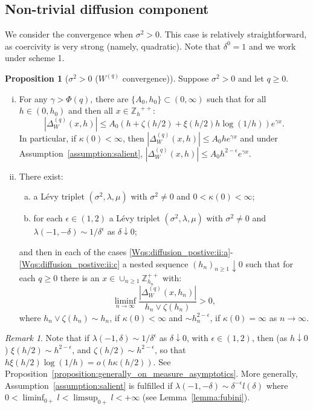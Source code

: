 \documentclass[pdftex,oneside,11pt,reqno]{amsart}
\theoremstyle{definition}
\theoremstyle{theorem}
\newtheorem{proposition}{Proposition}[section]
\theoremstyle{remark}
\newtheorem{remark}{Remark}[section]
\numberwithin{equation}{section}
\numberwithin{definition}{section}
\begin{document}
\subsection{Non-trivial diffusion component}
We consider the convergence when ${\sigma^2}>0$. This case is relatively straightforward, as coercivity is very strong (namely, quadratic). Note that $\delta^0=1$ and we work under scheme 1.

\begin{proposition}[${\sigma^2}>0$ (${W^{(q)}}$ convergence)] \label{proposition:Wqconvergence:non-trivial_diffusion}
Suppose ${\sigma^2}>0$ and let $q\geq 0$. 

\begin{enumerate}[(i)]
\item\label{Wqs:diffusion_positibe:i} For any $\gamma>\Phi(q)$, there are $\{A_0,h_0\}\subset (0,\infty)$ such that for all $h\in (0,h_0)$ and then all $x\in {\mathbb{Z}_h}^{++}$: $$\left\vert{\Delta_{W}^{(q)}(x,h)}\right\vert\leq A_0 \left(h+\zeta(h/2)+\xi(h/2)h\log(1/h)\right) e^{\gamma x}.$$ In particular, if $\kappa(0)<\infty$, then $\left\vert{\Delta_{W}^{(q)}(x,h)}\right\vert\leq A_0 he^{\gamma x}$ and under Assumption~\ref{assumption:salient}, $\left\vert{\Delta_{W}^{(q)}(x,h)}\right\vert\leq A_0 h^{2-\epsilon}e^{\gamma x}$. 
\item \label{Wqs:diffusion_positibe:ii} There exist:
\begin{enumerate}[(a)]
\item\label{Wqs:diffusion_postive:ii:a} a L\'evy triplet $({\sigma^2},{\lambda},{\mu})$ with ${\sigma^2}\ne 0$ and $0<\kappa(0)<\infty$;
\item\label{Wqs:diffusion_postive:ii:c}  for each $\epsilon\in (1,2)$ a L\'evy triplet $({\sigma^2},{\lambda},{\mu})$ with ${\sigma^2}\ne 0$ and $\lambda(-1,-\delta)\sim 1/\delta^\epsilon$ as $\delta\downarrow 0$;
\end{enumerate}
and then in each of the cases \ref{Wqs:diffusion_postive:ii:a}-\ref{Wqs:diffusion_postive:ii:c} a nested sequence $(h_n)_{n\geq 1}\downarrow 0$ such that for each $q\geq 0$ there is an $x\in \cup_{n\geq 1}\mathbb{Z}_{h_n}^{++}$ with: $$\liminf_{n\to\infty}\frac{\left\vert{\Delta_{W}^{(q)}(x,h_n)}\right\vert}{ h_n\lor \zeta(h_n)}>0,$$ where $h_n\lor \zeta(h_n)\sim h_n$, if $\kappa(0)<\infty$ and $\sim h_n^{2-\epsilon}$, if $\kappa(0)=\infty$ as $n\to \infty$. 
\end{enumerate}
\end{proposition}

\begin{remark}\label{remark:diffusion_positive:asymptotic}
Note that if $\lambda(-1,\delta)\sim 1/\delta^\epsilon$ as $\delta\downarrow 0$, with $\epsilon\in (1,2)$, then (as $h\downarrow 0$) $\xi(h/2)\sim h^{2-\epsilon}$, and $\zeta(h/2)\sim h^{2-\epsilon}$, so that $h\xi(h/2)\log(1/h)=o(h\kappa(h/2))$. See Proposition~\ref{proposition:generally_on_measure_asymptotics}. More generally, Assumption~\ref{assumption:salient} is fulfilled if ${\lambda}(-1,-\delta)\sim \delta^{-\epsilon}l(\delta)$ where $0<\liminf_{0+}l<\limsup_{0+}l<+\infty$ (see Lemma~\ref{lemma:fubini}). 
\end{remark}
\end{document}
